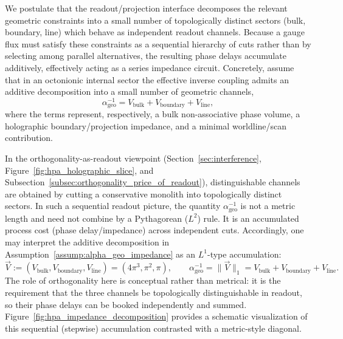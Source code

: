 \begin{assumption}
\label{assump:alpha_geo_impedance}
We postulate that the readout/projection interface decomposes the relevant geometric constraints into a small number of topologically distinct sectors (bulk, boundary, line) which behave as independent readout channels. Because a gauge flux must satisfy these constraints as a sequential hierarchy of cuts rather than by selecting among parallel alternatives, the resulting phase delays accumulate additively, effectively acting as a series impedance circuit. Concretely, assume that in an octonionic internal sector the effective inverse coupling admits an additive decomposition into a small number of geometric channels,
$$
\alpha_{\mathrm{geo}}^{-1} = V_{\mathrm{bulk}} + V_{\mathrm{boundary}} + V_{\mathrm{line}},
$$
where the terms represent, respectively, a bulk non-associative phase volume, a holographic boundary/projection impedance, and a minimal worldline/scan contribution.
\end{assumption}

\begin{remark}
In the orthogonality-as-readout viewpoint (Section~\ref{sec:interference}, Figure~\ref{fig:hpa_holographic_slice}, and Subsection~\ref{subsec:orthogonality_price_of_readout}), distinguishable channels are obtained by cutting a conservative monolith into topologically distinct sectors.
In such a sequential readout picture, the quantity $\alpha_{\mathrm{geo}}^{-1}$ is not a metric length and need not combine by a Pythagorean ($L^2$) rule. It is an accumulated process cost (phase delay/impedance) across independent cuts.
Accordingly, one may interpret the additive decomposition in Assumption~\ref{assump:alpha_geo_impedance} as an $L^1$-type accumulation:
$$
\vec{V}:=(V_{\mathrm{bulk}},V_{\mathrm{boundary}},V_{\mathrm{line}})=(4\pi^3,\pi^2,\pi),
\qquad
\alpha_{\mathrm{geo}}^{-1}=\|\vec{V}\|_1=V_{\mathrm{bulk}}+V_{\mathrm{boundary}}+V_{\mathrm{line}}.
$$
The role of orthogonality here is conceptual rather than metrical: it is the requirement that the three channels be topologically distinguishable in readout, so their phase delays can be booked independently and summed.
Figure~\ref{fig:hpa_impedance_decomposition} provides a schematic visualization of this sequential (stepwise) accumulation contrasted with a metric-style diagonal.
\end{remark}

